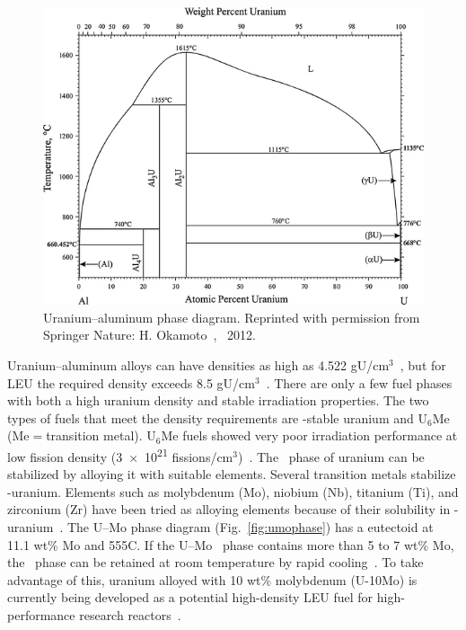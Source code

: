 
\begin{figure}
\centering
\includegraphics[width=4.75 in]{images/u-al-phase-d.png}
\caption[Uranium--aluminum phase diagram]{Uranium--aluminum phase diagram. Reprinted with permission from Springer Nature: H. Okamoto~\cite{okamoto2012al}, \textcopyright\ 2012\@.}
\label{fig:ualphase}
\end{figure}


Uranium--aluminum alloys can have densities as high as 4.522 gU/cm$^3$~\cite{saller1956study}, but for LEU the required density exceeds 8.5 gU/cm$^3$~\cite{sannen2014}. There are only a few fuel phases with both a high uranium density and stable irradiation properties. The two types of fuels that meet the density requirements are \textgamma-stable uranium and U$_6$Me (Me${}={}$transition metal). U$_6$Me fuels showed very poor irradiation performance at low fission density (\num{3e21} fissions/cm$^3$)~\cite{meyer2000irradiation, hofman1987irradiation, vandenberghe2010}. The \textgamma~phase of uranium can be stabilized by alloying it with suitable elements. Several transition metals stabilize \textgamma-uranium. Elements such as molybdenum (Mo), niobium (Nb), titanium (Ti), and zirconium (Zr) have been tried as alloying elements because of their solubility in \textgamma-uranium~\cite{donze1959stabilisation,giraud1973formation,lopes2013mechanical}. The U--Mo phase diagram (Fig.~\ref{fig:umophase}) has a eutectoid at 11.1 wt\% Mo and 555\textdegree C. If the U--Mo \textgamma~phase contains more than 5 to 7 wt\% Mo, the \textgamma~phase can be retained at room temperature by rapid cooling~\cite{saller1954transformation, bostrom1957}.
 To take advantage of this, uranium alloyed with 10 wt$\%$ molybdenum (U-10Mo) is currently being developed as a potential high-density LEU fuel for high-performance research reactors~\cite{prabhakaran2017u, meyer2014irradiation, williams2017post}. 

